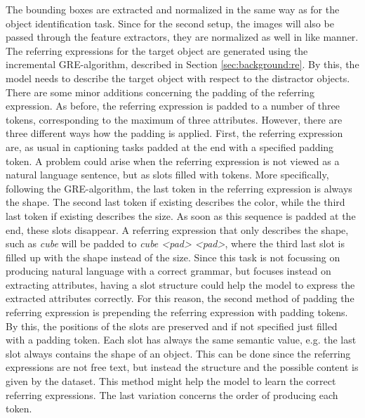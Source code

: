 The bounding boxes are extracted and normalized in the same way as for the object identification task.
Since for the second setup, the images will also be passed through the feature extractors, they are normalized as well in like manner.
The referring expressions for the target object are generated using the incremental GRE-algorithm, described in Section \ref{sec:background:re}.
By this, the model needs to describe the target object with respect to the distractor objects.
There are some minor additions concerning the padding of the referring expression.
As before, the referring expression is padded to a number of three tokens, corresponding to the maximum of three attributes.
However, there are three different ways how the padding is applied.
First, the referring expression are, as usual in captioning tasks padded at the end with a specified padding token.
A problem could arise when the referring expression is not viewed as a natural language sentence, but as slots filled with tokens.
More specifically, following the GRE-algorithm, the last token in the referring expression is always the shape.
The second last token if existing describes the color, while the third last token if existing describes the size.
As soon as this sequence is padded at the end, these slots disappear.
A referring expression that only describes the shape, such as \emph{cube} will be padded to \emph{cube <pad> <pad>}, where the third last slot is filled up with the shape instead of the size.
Since this task is not focussing on producing natural language with a correct grammar, but focuses instead on extracting attributes, having a slot structure could help the model to express the extracted attributes correctly.
For this reason, the second method of padding the referring expression is prepending the referring expression with padding tokens.
By this, the positions of the slots are preserved and if not specified just filled with a padding token.
Each slot has always the same semantic value, e.g. the last slot always contains the shape of an object.
This can be done since the referring expressions are not free text, but instead the structure and the possible content is given by the dataset.
This method might help the model to learn the correct referring expressions.
The last variation concerns the order of producing each token.
